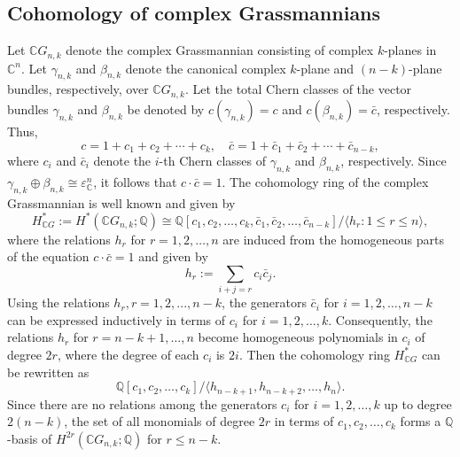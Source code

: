 \documentclass{amsart}
\begin{document}
	\subsection{Cohomology of complex Grassmannians}
	Let $\mathbb{C}G_{n,k}$ denote the complex Grassmannian consisting of complex $k$-planes in $\mathbb{C}^n$. 
	Let $\gamma_{n,k}$ and $\beta_{n,k}$ denote the canonical complex $k$-plane and $(n-k)$-plane bundles, respectively, over $\mathbb{C}G_{n,k}$.
	Let the total Chern classes of the vector bundles $\gamma_{n,k}$ and $\beta_{n,k}$ be denoted by $c(\gamma_{n,k}) = c$ and $c(\beta_{n,k}) = \bar{c}$, respectively. Thus,
	$$c = 1 + c_1 + c_2 + \cdots + c_k, \quad \bar{c} = 1 + \bar{c}_1 + \bar{c}_2 + \cdots + \bar{c}_{n-k},$$
	where $c_i$ and $\bar{c}_i$ denote the $i$-th Chern classes of $\gamma_{n,k}$ and $\beta_{n,k}$, respectively.
	Since $\gamma_{n,k} \oplus \beta_{n,k} \cong \varepsilon_{\mathbb{C}}^n$, it follows that  $c \cdot \bar{c} = 1$.
	The  cohomology ring of the complex Grassmannian is well known and given by  
	$$
	H^*_{\mathbb{C}G}:=H^*(\mathbb{C}G_{n,k};\mathbb{Q}) \cong \mathbb{Q}[c_1, c_2, \dots, c_k, \bar{c}_1, \bar{c}_2, \dots, \bar{c}_{n-k}]/\langle h_r: 1\leq r\leq n\rangle,$$  
	where  the relations $h_r$ for $r = 1, 2, \dots, n$ are induced from the homogeneous parts of the equation $c\cdot \bar c=1$ and given by  
	\[
	h_r := \sum_{i+j=r} c_i \bar{c}_j.
	\]  
	Using the relations $h_r, r=1,2,...,n-k$, the generators $\bar{c}_i$ for $i = 1, 2, \dots, n-k$ can be expressed inductively in terms of $c_i$ for $i = 1, 2, \dots, k$.  Consequently, the relations $h_r$ for $r = n-k+1, \dots, n$ become homogeneous polynomials in $c_i$ of degree $2r$, where the degree of each $c_i$ is $2i$. Then the cohomology ring $H^*_{\mathbb{C}G}$ can be rewritten as  
	\begin{equation}\label{cohomo of grass}
		\mathbb{Q}[c_1, c_2, \dots, c_k]/\langle h_{n-k+1}, h_{n-k+2}, \dots, h_n \rangle.
	\end{equation}
	Since there are no relations among the generators $c_i$ for $i = 1, 2, \dots, k$ up to degree $2(n-k)$, the set of all monomials of degree $2r$ in terms of $c_1, c_2, \ldots, c_k$ forms a $\mathbb{Q}$-basis of $H^{2r}(\mathbb{C}G_{n,k};\mathbb{Q})$ for $r \leq n-k$.
	
\end{document}
